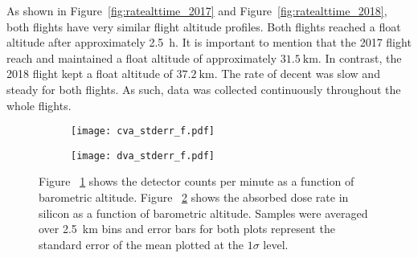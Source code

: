 %
As shown in Figure~\ref{fig:ratealttime_2017} and Figure~\ref{fig:ratealttime_2018}, both flights have very similar flight altitude profiles.  Both flights reached a float altitude after approximately \SI{2.5}{\hour}.  It is important to mention that the 2017 flight reach and maintained a float altitude of approximately $\SI{31.5}{\kilo\meter}$.  In contrast, the 2018 flight kept a float altitude of $\SI{37.2}{\kilo\meter}$.  The rate of decent was slow and steady for both flights.  
%
As such, data was collected continuously throughout the whole flights. %
%

\begin{figure}[H]%
\centering
\begin{subfigure}{.5\textwidth}
  \centering
  \texttt{[image: cva\_stderr\_f.pdf]}
  \caption{}
  \label{fig:sub2}
\end{subfigure}%
\begin{subfigure}{.5\textwidth}
  \centering
  \texttt{[image: dva\_stderr\_f.pdf]}
  \caption{}
  \label{fig:sub1}
\end{subfigure}%
\caption{Figure ~\ref{fig:sub2} shows the detector counts per minute as a function of barometric altitude. Figure ~\ref{fig:sub1} shows the absorbed dose rate in silicon as a function of barometric altitude.  Samples were averaged over \SI{2.5}{\kilo\meter} bins and error bars for both plots represent the standard error of the mean plotted at the $1\sigma$ level.}
\label{fig:dose-count-subplots}
\end{figure}

